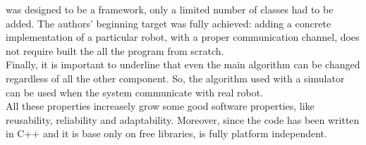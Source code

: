 was designed to be a framework, only a limited number of classes
had to be added. The authors' beginning target was fully achieved:
adding a concrete implementation of a particular robot, with a
proper communication channel, does not require built the all
the program from scratch.
\\
Finally, it is important to underline that even the main algorithm
can be changed regardless of all the other component. So, the
algorithm used with a simulator can be used when the system
communicate with real robot.
\\
All these properties increasely grow some good software properties,
like reusability, reliability and adaptability. Moreover,
since the code has been written in C++ and it is base only on
free libraries, \framework{} is fully platform independent.
